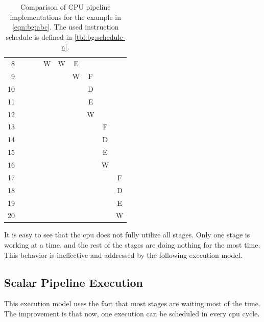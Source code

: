 \begin{table}
{{\begin{tabular}{rccccccccc}
                 8 &   &   &   & W & W & E &   &   &   \\
                 9 &   &   &   &   &   & W & F &   &   \\ \rowcolor[gray]{.975}
                10 &   &   &   &   &   &   & D &   &   \\
                11 &   &   &   &   &   &   & E &   &   \\ \rowcolor[gray]{.975}
                12 &   &   &   &   &   &   & W &   &   \\
                13 &   &   &   &   &   &   &   & F &   \\ \rowcolor[gray]{.975}
                14 &   &   &   &   &   &   &   & D &   \\
                15 &   &   &   &   &   &   &   & E &   \\ \rowcolor[gray]{.975}
                16 &   &   &   &   &   &   &   & W &   \\
                17 &   &   &   &   &   &   &   &   & F \\ \rowcolor[gray]{.975}
                18 &   &   &   &   &   &   &   &   & D \\
                19 &   &   &   &   &   &   &   &   & E \\ \rowcolor[gray]{.975}
                20 &   &   &   &   &   &   &   &   & W \\ 
                \bottomrule
            \end{tabular}
        }
    }
    \caption[Comparison of CPU pipeline implementations]{Comparison of CPU pipeline implementations for the example in \cref{eqn:bg:abc}. 
    The used instruction schedule is defined in \cref{tbl:bg:schedule-a}.}
    \label{tbl:bg:pipeline}
\end{table}

It is easy to see that the \ac{cpu} does not fully utilize all stages.
Only one stage is working at a time, and the rest of the stages are doing nothing for the most time.
This behavior is ineffective and addressed by the following execution model.

\subsection{Scalar Pipeline Execution}
This execution model uses the fact that most stages are waiting most of the time.
The improvement is that now, one execution can be scheduled in every \ac{cpu} cycle.

